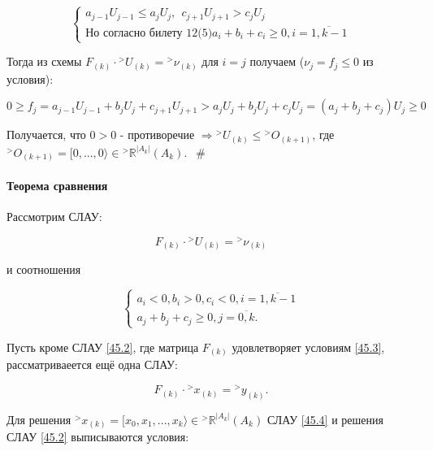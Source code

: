 \documentclass[__main__.tex]{subfiles}
\begin{document}
\begin{equation}\label{45.1}
\begin{cases}
a_{j-1} U_{j-1} \leq a_j U_j, \ \ c_{j+1} U_{j+1} > c_j U_j \\
\text{Но согласно билету 12(5)} a_i+b_i+c_i \geq 0, i = \overline{1,k-1}
\end{cases}
\end{equation}

Тогда из схемы $F_{\left(k\right)} \cdot {}^>U_{\left(k\right)} = {}^>\nu_{\left(k\right)}$ для $i=j$ получаем ($\nu_j = f_j \leq 0$ из условия):

$$
0 \geq f_j = a_{j-1} U_{j-1} + b_j U_j + c_{j+1} U_{j+1} > a_j U_j + b_j U_j + c_j U_j = \left(a_j + b_j + c_j\right) U_j \geq 0
$$

Получается, что $0>0$ - противоречие $\Rightarrow {}^> U_{\left(k\right)} \leq {}^> O_{\left(k+1\right)}$, где ${}^> O_{\left(k+1\right)} = [0,...,0 \rangle \in {}^> \mathbb{R}^{\left|A_k\right|}\left(A_k\right)$. $ \ \ \#$

\paragraph{Теорема сравнения}

Рассмотрим СЛАУ:

\begin{equation} \label{45.2}
F_{\left(k\right)} \cdot {}^> U_{\left(k\right)} = {}^> \nu_{\left(k\right)}
\end{equation}

и соотношения

\begin{equation} \label{45.3}
\begin{cases}
a_i < 0, b_i > 0, c_i < 0, i = \overline{1,k-1} \\
a_j+b_j+c_j \geq 0, j =\overline{0,k}.
\end{cases}
\end{equation}

Пусть кроме СЛАУ \ref{45.2}, где матрица $F_{\left(k\right)}$ удовлетворяет условиям \ref{45.3}, рассматриваеется ещё одна СЛАУ:

\begin{equation}\label{45.4}
F_{\left(k\right)} \cdot {}^> x_{\left(k\right)} = {}^> y_{\left(k\right)}.
\end{equation}

Для решения ${}^> x_{\left(k\right)} = [x_0, x_1, ..., x_k\rangle \in {}^> \mathbb{R}^{\left|A_k\right|} \left(A_k\right)$ СЛАУ \ref{45.4} и решения СЛАУ \ref{45.2} выписываются условия:
\end{document}

